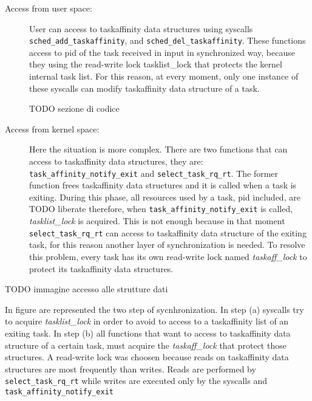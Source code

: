 \begin{description}
\item[Access from user space:] User can access to taskaffinity data structures using syscalls \texttt{sched\_add\_taskaffinity}, and 
\texttt{sched\_del\_taskaffinity}. These functions access to pid of the task received in input in synchronized way, because they using the read-write lock
tasklist\_lock that protects the kernel internal task list. For this reason, at every moment, only one instance of these syscalls can modify taskaffinity 
data structure of a task.

TODO sezione di codice

\item[Access from kernel space:] Here the situation is more complex. There are two functions that can access to taskaffinity data structures, they are:
\texttt{task\_affinity\_notify\_exit} and \texttt{select\_task\_rq\_rt}. The former function frees taskaffinity data structures and it is called when a 
task is exiting. During this phase, all resources used by a task, pid included, are TODO liberate therefore, when \texttt{task\_affinity\_notify\_exit} is 
called, \textit{tasklist\_lock} is acquired. This is not enough because in that moment \texttt{select\_task\_rq\_rt} can access to taskaffinity data 
structure of the exiting task, for this reason another layer of synchronization is needed. To resolve this problem, every task has its own read-write lock 
named \textit{taskaff\_lock} to protect its taskaffinity data structures. 

\end{description}

TODO immagine accesso alle strutture dati

In figure are represented the two step of sycnhronization. In step (a) syscalls try to acquire \textit{tasklist\_lock} in order to avoid to access to a 
taskaffinity list of an exiting task. In step (b) all functions that want to access to taskaffinity data structure of a certain task, must acquire the
\textit{taskaff\_lock} that protect those structures. A read-write lock was choosen because reads on taskaffinity data structures are most frequently than 
writes. Reads are performed by \texttt{select\_task\_rq\_rt} while writes are executed only by the syscalls and \texttt{task\_affinity\_notify\_exit}





